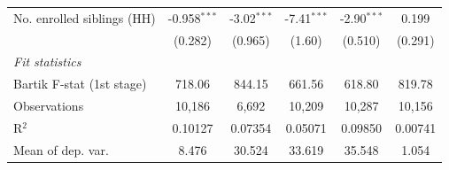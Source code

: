 \begin{tabular}{lccccc}
   No. enrolled siblings (HH)                                            & -0.958$^{***}$                  & -3.02$^{***}$                    & -7.41$^{***}$                       & -2.90$^{***}$                        & 0.199\\   
                                                                         & (0.282)                         & (0.965)                          & (1.60)                              & (0.510)                              & (0.291)\\   
   \midrule
   \emph{Fit statistics}\\
   Bartik F-stat (1st stage)                                     & 718.06                          & 844.15                           & 661.56                              & 618.80                               & 819.78\\  
   Observations                                                          & 10,186                          & 6,692                            & 10,209                              & 10,287                               & 10,156\\  
   R$^2$                                                                 & 0.10127                         & 0.07354                          & 0.05071                             & 0.09850                              & 0.00741\\  
   Mean of dep. var.                                                     & 8.476                           & 30.524                           & 33.619                              & 35.548                               & 1.054\\  
\bottomrule
\end{tabular}
